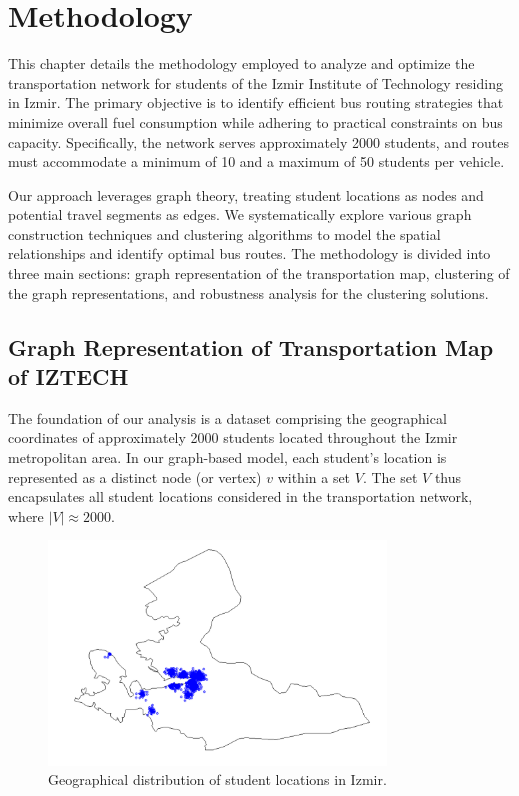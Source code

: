 \chapter{Methodology}
\label{ch:method}

This chapter details the methodology employed to analyze and optimize the transportation network for students of the Izmir Institute of Technology residing in Izmir. The primary objective is to identify efficient bus routing strategies that minimize overall fuel consumption while adhering to practical constraints on bus capacity. Specifically, the network serves approximately 2000 students, and routes must accommodate a minimum of 10 and a maximum of 50 students per vehicle. 

Our approach leverages graph theory, treating student locations as nodes and potential travel segments as edges. We systematically explore various graph construction techniques and clustering algorithms to model the spatial relationships and identify optimal bus routes. The methodology is divided into three main sections: graph representation of the transportation map, clustering of the graph representations, and robustness analysis for the clustering solutions.

\section{Graph Representation of Transportation Map of IZTECH}
\label{sec:graph_representation}

The foundation of our analysis is a dataset comprising the geographical coordinates of approximately 2000 students located throughout the Izmir metropolitan area. In our graph-based model, each student's location is represented as a distinct node (or vertex) $v$ within a set $V$. The set $V$ thus encapsulates all student locations considered in the transportation network, where $|V| \approx 2000$. 

\begin{figure}[!htbp]
\centering
\includegraphics[width=0.8\textwidth]{img/student_map}
\caption{Geographical distribution of student locations in Izmir.}
\label{fig:student_map}
\end{figure}

